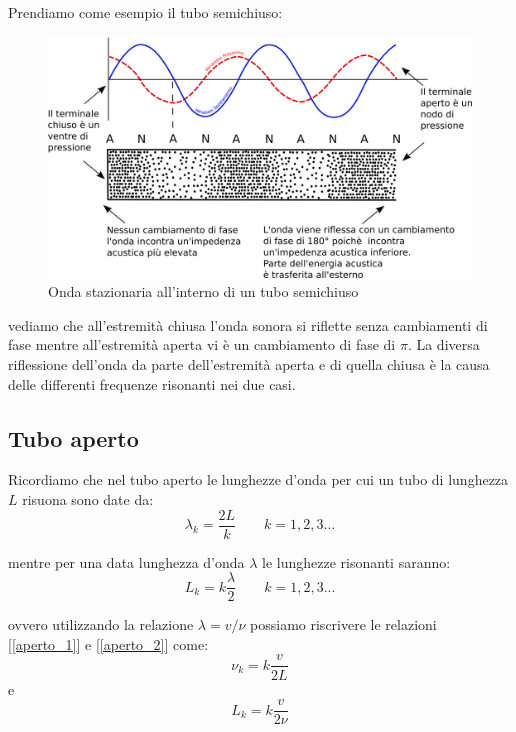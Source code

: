\documentclass[a4paper,10pt,oneside]{article}
\begin{document}
Prendiamo come esempio il tubo semichiuso:
\begin{figure}[H]
 \centering
 \includegraphics[width=1.1\textwidth]{../Immagini/tubo_semichiuso.png}
 \caption{Onda stazionaria all'interno di un tubo semichiuso}
 \label{fig:tubo_semichiuso}
\end{figure}
vediamo che all'estremità chiusa l'onda sonora si riflette senza cambiamenti di fase mentre all'estremità aperta vi è un cambiamento di fase di $\pi$. La diversa riflessione dell'onda da parte dell'estremità aperta e di quella chiusa è la causa delle differenti frequenze risonanti nei due casi.
\subsection{Tubo aperto}

Ricordiamo che nel tubo aperto le lunghezze d'onda per cui un tubo  di lunghezza $L$ risuona sono date da:
\begin{equation}\label{aperto_1}
 \lambda_k=\frac{2L}{k}\qquad k=1,2,3...
\end{equation}

mentre per una data lunghezza d'onda $\lambda$ le lunghezze risonanti saranno:
\begin{equation}\label{aperto_2}
 L_k=k\frac{\lambda}{2}\qquad k=1,2,3... 
\end{equation}

ovvero utilizzando la relazione $\lambda=v/\nu$ possiamo riscrivere le relazioni [\ref{aperto_1}] e [\ref{aperto_2}] come:
\begin{equation}
 \nu_k=k\frac{v}{2L}
\end{equation}
e
\begin{equation}
 L_k=k\frac{v}{2\nu}
\end{equation}
\end{document}
